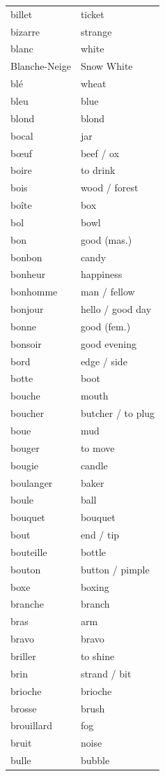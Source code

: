 \documentclass[12pt,a4paper]{article}
\begin{document}
\begin{longtable}{p{4cm} p{6cm}}
billet & ticket \\
bizarre & strange \\
blanc & white \\
Blanche-Neige & Snow White \\
blé & wheat \\
bleu & blue \\
blond & blond \\
bocal & jar \\
bœuf & beef / ox \\
boire & to drink \\
bois & wood / forest \\
boîte & box \\
bol & bowl \\
bon & good (mas.) \\
bonbon & candy \\
bonheur & happiness \\
bonhomme & man / fellow \\
bonjour & hello / good day \\
bonne & good (fem.) \\
bonsoir & good evening \\
bord & edge / side \\
botte & boot \\
bouche & mouth \\
boucher & butcher / to plug \\
boue & mud \\
bouger & to move \\
bougie & candle \\
boulanger & baker \\
boule & ball \\
bouquet & bouquet \\
bout & end / tip \\
bouteille & bottle \\
bouton & button / pimple \\
boxe & boxing \\
branche & branch \\
bras & arm \\
bravo & bravo \\
briller & to shine \\
brin & strand / bit \\
brioche & brioche \\
brosse & brush \\
brouillard & fog \\
bruit & noise \\
bulle & bubble \\

\end{longtable}
\end{document}

